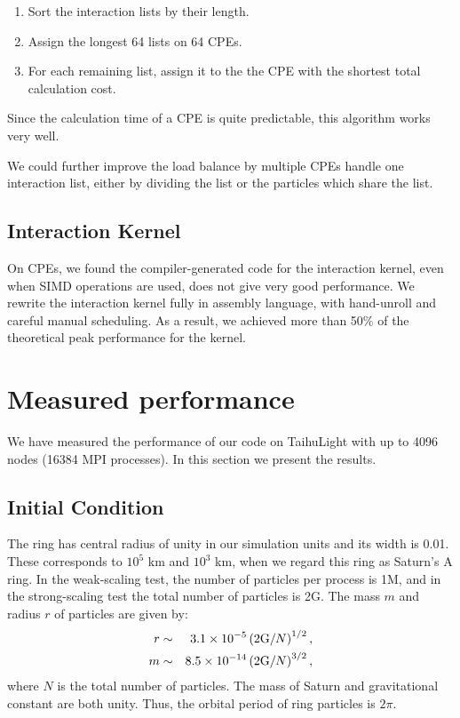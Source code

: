 \documentclass[oribibl]{llncs}
\begin{document}
\begin{enumerate}
  
\item Sort the interaction lists by their length.

\item Assign the longest 64 lists on 64 CPEs.

\item For each remaining list, assign it to the the CPE with the
  shortest total calculation cost.
  
\end{enumerate}

Since the calculation time of a CPE is quite predictable, this
algorithm works very well.

We could further improve the load balance by multiple CPEs handle
one interaction list, either by dividing the list or the particles
which share the list.

\subsection{Interaction Kernel}

On CPEs, we found the compiler-generated code for the interaction
kernel, even when SIMD operations are used, does not give very good
performance. We rewrite the interaction kernel fully in assembly
language, with hand-unroll and careful manual scheduling. As a result,
we achieved more than 50\% of the theoretical peak performance for the
kernel.

\section{Measured performance}
\label{sec:result}

We have measured the performance of our code on TaihuLight with up to
4096 nodes (16384 MPI processes). In this section we present the
results.

\subsection{Initial Condition}

The ring has central radius of unity in our simulation units and its
width is 0.01. These corresponds to $10^5$ km and $10^3$ km, when we
regard this ring as Saturn's A ring.  In the weak-scaling test, the
number of particles per process is 1M, and in the strong-scaling test
the total number of particles is 2G. The mass $m$ and radius $r$ of
particles are given by:
\begin{eqnarray}
  r &\sim& 3.1 \times 10^{-5} \left( 2 {\rm G} / N \right)^{1/2}, \\ 
  m &\sim& 8.5 \times 10^{-14} \left( 2 {\rm G} / N \right)^{3/2}, 
\end{eqnarray}
where $N$ is the total number of particles. The mass of Saturn and
gravitational constant are both unity. Thus, the orbital period of
ring particles is $2\pi$.
\end{document}

